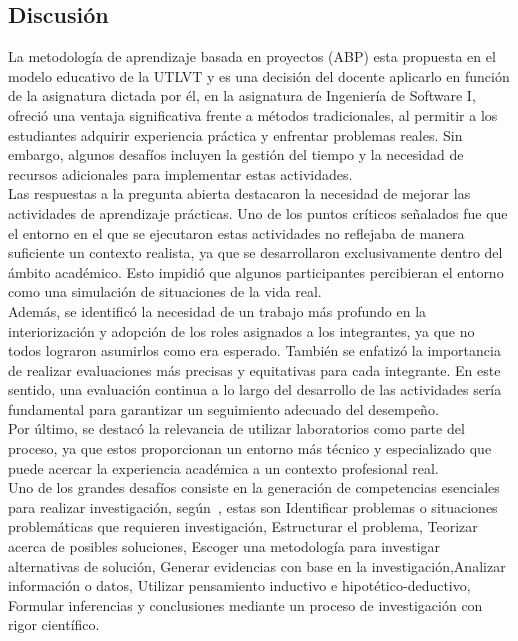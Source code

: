 \documentclass[12pt]{article}
\begin{document}
\begin{multicols}{2}

\section{Discusión}
\label{sec:discusion}
La metodología de aprendizaje  basada en proyectos (ABP) esta propuesta en el modelo educativo de la UTLVT\cite{canchingre2023} y es una decisión del docente aplicarlo en función de la asignatura dictada por él, en la asignatura de Ingeniería de Software I,  ofreció una ventaja significativa frente a métodos tradicionales, al permitir a los estudiantes adquirir experiencia práctica y enfrentar problemas reales. Sin embargo, algunos desafíos incluyen la gestión del tiempo y la necesidad de recursos adicionales para implementar estas actividades.\\
Las respuestas a la pregunta abierta destacaron la necesidad de mejorar las actividades de aprendizaje prácticas. Uno de los puntos críticos señalados fue que el entorno en el que se ejecutaron estas actividades no reflejaba de manera suficiente un contexto realista, ya que se desarrollaron exclusivamente dentro del ámbito académico. Esto impidió que algunos participantes percibieran el entorno como una simulación de situaciones de la vida real.\\
Además, se identificó la necesidad de un trabajo más profundo en la interiorización y adopción de los roles asignados a los integrantes, ya que no todos lograron asumirlos como era esperado. También se enfatizó la importancia de realizar evaluaciones más precisas y equitativas para cada integrante. En este sentido, una evaluación continua a lo largo del desarrollo de las actividades sería fundamental para garantizar un seguimiento adecuado del desempeño.\\
Por último, se destacó la relevancia de utilizar laboratorios como parte del proceso, ya que estos proporcionan un entorno más técnico y especializado que puede acercar la experiencia académica a un contexto profesional real.\\
Uno de los grandes desafíos consiste en la generación de competencias esenciales para realizar investigación, según~\cite{madrid2020}, estas son Identificar problemas o situaciones problemáticas que requieren investigación, Estructurar el problema, Teorizar acerca de posibles soluciones, Escoger una metodología para investigar alternativas de solución, Generar evidencias con base en la investigación,Analizar información o datos, Utilizar pensamiento inductivo e hipotético-deductivo, Formular inferencias y conclusiones mediante un proceso de investigación con rigor científico. \\


\end{multicols}
\end{document}
